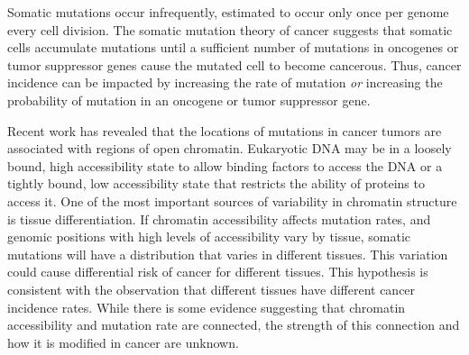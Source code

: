 
Somatic mutations occur infrequently, estimated to occur only once per genome every cell division.
The somatic mutation theory of cancer suggests that somatic cells accumulate mutations until a sufficient number of mutations in oncogenes or tumor suppressor genes cause the mutated cell to become cancerous.
Thus, cancer incidence can be impacted by increasing the rate of mutation \textit{or} increasing the probability of mutation in an oncogene or tumor suppressor gene.

Recent work has revealed that the locations of mutations in cancer tumors are associated with regions of open chromatin.
Eukaryotic DNA may be in a loosely bound, high accessibility state to allow binding factors to access the DNA or
a tightly bound, low accessibility state that restricts the ability of proteins to access it.
One of the most important sources of variability in chromatin structure is tissue differentiation.
If chromatin accessibility affects mutation rates, and genomic positions with high levels of accessibility vary by tissue, somatic mutations will have a distribution that varies in different tissues.
This variation could cause differential risk of cancer for different tissues.
This hypothesis is consistent with the observation that different tissues have different cancer incidence rates.
While there is some evidence suggesting that chromatin accessibility and mutation rate are connected, the strength of this connection and how it is modified in cancer are unknown.


